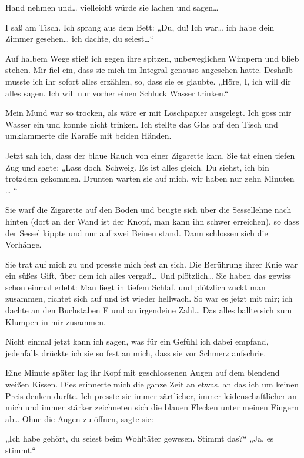 Hand nehmen und\ldots{} vielleicht würde sie lachen und sagen\ldots{}

I saß am Tisch. Ich sprang aus dem Bett: „Du, du! Ich war\ldots{} ich
habe dein Zimmer gesehen\ldots{} ich dachte, du seiest\ldots{}“

Auf halbem Wege stieß ich gegen ihre spitzen, unbeweglichen Wimpern
und blieb stehen. Mir fiel ein, dass sie mich im Integral genauso
angesehen hatte. Deshalb musste ich ihr sofort alles erzählen, so,
dass sie es glaubte. „Höre, I, ich will dir alles sagen. Ich will
nur vorher einen Schluck Wasser trinken.“

Mein Mund war so trocken, als wäre er mit Löschpapier ausgelegt.
Ich goss mir Wasser ein und konnte nicht trinken. Ich stellte das
Glas auf den Tisch und umklammerte die Karaffe mit beiden Händen.

Jetzt sah ich, dass der blaue Rauch von einer Zigarette kam. Sie
tat einen tiefen Zug und sagte: „Lass doch. Schweig. Es ist alles
gleich. Du siehst, ich bin trotzdem gekommen. Drunten warten sie
auf mich, wir haben nur zehn Minuten \ldots{} “

Sie warf die Zigarette auf den Boden und beugte sich über die
Sessellehne nach hinten (dort an der Wand ist der Knopf, man kann
ihn schwer erreichen), so dass der Sessel kippte und nur auf zwei
Beinen stand. Dann schlossen sich die Vorhänge.

Sie trat auf mich zu und presste mich fest an sich. Die Berührung
ihrer Knie war ein süßes Gift, über dem ich alles vergaß\ldots{} Und
plötzlich\ldots{} Sie haben das gewiss schon einmal erlebt: Man liegt in
tiefem Schlaf, und plötzlich zuckt man zusammen, richtet sich auf
und ist wieder hellwach. So war es jetzt mit mir; ich dachte an den
Buchstaben F und an irgendeine Zahl\ldots{} Das alles ballte sich zum
Klumpen in mir zusammen.

Nicht einmal jetzt kann ich sagen, was für ein Gefühl ich dabei
empfand, jedenfalls drückte ich sie so fest an mich, dass sie vor
Schmerz aufschrie.

Eine Minute später lag ihr Kopf mit geschlossenen Augen auf dem
blendend weißen Kissen. Dies erinnerte mich die ganze Zeit an
etwas, an das ich um keinen Preis denken durfte. Ich presste sie
immer zärtlicher, immer leidenschaftlicher an mich und immer
stärker zeichneten sich die blauen Flecken unter meinen Fingern
ab\ldots{} Ohne die Augen zu öffnen, sagte sie:

„Ich habe gehört, du seiest beim Wohltäter gewesen. Stimmt das?“
„Ja, es stimmt.“

